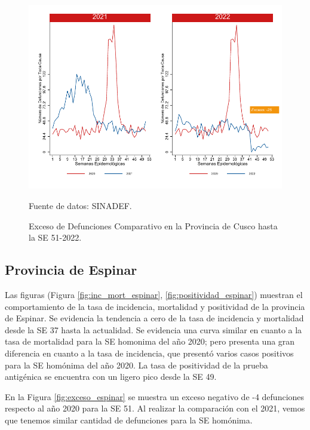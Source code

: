 \documentclass[12pt,a4paper,openany]{book}
\begin{document}
	\begin{figure}[h]
		\caption{Exceso de Defunciones Comparativo en la Provincia de Cusco hasta la SE 51-2022.}\label{fig:exceso_cusco}
		\begin{center}
			\includegraphics[width=0.7\linewidth]{../figuras/exceso_7.pdf}
		\end{center}
		{\footnotesize {Fuente de datos: SINADEF.}}
	\end{figure}
	
	\clearpage
	
	\subsection*{Provincia de Espinar}
	\noindent Las figuras (Figura \ref{fig:inc_mort_espinar}, \ref{fig:positividad_espinar}) muestran el comportamiento de la tasa de incidencia, mortalidad y positividad de la provincia de Espinar. Se evidencia la tendencia a cero de la tasa de incidencia y mortalidad desde la SE 37 hasta la actualidad. Se evidencia una curva similar en cuanto a la tasa de mortalidad para la SE homonima del año 2020; pero presenta una gran diferencia en cuanto a la tasa de incidencia, que presentó varios casos positivos para la SE homónima del año 2020. La tasa de positividad de la prueba antigénica se encuentra con un ligero pico desde la SE 49.
	
	En la Figura \ref{fig:exceso_espinar} se muestra un exceso negativo de -4 defunciones respecto al año 2020 para la SE 51. Al realizar la comparación con el 2021, vemos que tenemos similar cantidad de defunciones para la SE homónima.
	
\end{document}
